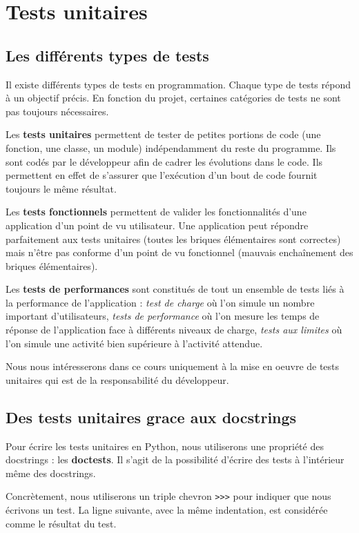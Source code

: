 \documentclass[12pt, a4paper]{article}
\begin{document}
\section{Tests unitaires}
\subsection{Les différents types de tests}
Il existe différents types de tests en programmation. Chaque type de tests répond à un objectif précis. En fonction du projet, certaines catégories de tests ne sont pas toujours nécessaires.

Les \textbf{tests unitaires} permettent de tester de petites portions de code (une fonction, une classe, un module) indépendamment du reste du programme. Ils sont codés par le développeur afin de cadrer les évolutions dans le code. Ils permettent en effet de s'assurer que l'exécution d'un bout de code fournit toujours le même résultat.

Les \textbf{tests fonctionnels} permettent de valider les fonctionnalités d'une application d'un point de vu utilisateur. Une application peut répondre parfaitement aux tests unitaires (toutes les briques élémentaires sont correctes) mais n'être pas conforme d'un point de vu fonctionnel (mauvais enchaînement des briques élémentaires).

Les \textbf{tests de performances} sont constitués de tout un ensemble de tests liés à la performance de l'application : \textit{test de charge} où l'on simule un nombre important d'utilisateurs, \textit{tests de performance} où l'on mesure les temps de réponse de l'application face à différents niveaux de charge, \textit{tests aux limites} où l'on simule une activité bien supérieure à l'activité attendue.

Nous nous intéresserons dans ce cours uniquement à la mise en oeuvre de tests unitaires qui est de la responsabilité du développeur.


\subsection{Des tests unitaires grace aux docstrings} 
Pour écrire les tests unitaires en Python, nous utiliserons une propriété des docstrings : les \textbf{doctests}. Il s'agit de la possibilité d'écrire des tests à l'intérieur même des docstrings. 

Concrètement, nous utiliserons un triple chevron \lstinline{>>>} pour indiquer que nous écrivons un test. La ligne suivante, avec la même indentation, est considérée comme le résultat du test.
\end{document}
